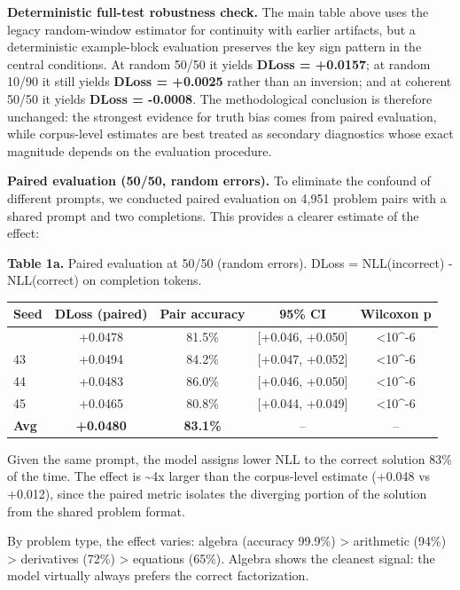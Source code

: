 \documentclass[
  11pt,
]{article}
\newcounter{none} %
\begin{document}
\textbf{Deterministic full-test robustness check.} The main table above
uses the legacy random-window estimator for continuity with earlier
artifacts, but a deterministic example-block evaluation preserves the
key sign pattern in the central conditions. At random 50/50 it yields
\textbf{DLoss = +0.0157}; at random 10/90 it still yields \textbf{DLoss
= +0.0025} rather than an inversion; and at coherent 50/50 it yields
\textbf{DLoss = -0.0008}. The methodological conclusion is therefore
unchanged: the strongest evidence for truth bias comes from paired
evaluation, while corpus-level estimates are best treated as secondary
diagnostics whose exact magnitude depends on the evaluation procedure.

\textbf{Paired evaluation (50/50, random errors).} To eliminate the
confound of different prompts, we conducted paired evaluation on 4,951
problem pairs with a shared prompt and two completions. This provides a
clearer estimate of the effect:

\textbf{Table 1a.} Paired evaluation at 50/50 (random errors). DLoss =
NLL(incorrect) - NLL(correct) on completion tokens.

{\def\LTcaptype{none} %
\begin{longtable}[]{@{}lcccc@{}}
\toprule\noalign{}
Seed & DLoss (paired) & Pair accuracy & 95\% CI & Wilcoxon p \\
\midrule\noalign{}
\endhead
\bottomrule\noalign{}
\endlastfoot
42 & +0.0478 & 81.5\% & {[}+0.046, +0.050{]} & \textless10\^{}-6 \\
43 & +0.0494 & 84.2\% & {[}+0.047, +0.052{]} & \textless10\^{}-6 \\
44 & +0.0483 & 86.0\% & {[}+0.046, +0.050{]} & \textless10\^{}-6 \\
45 & +0.0465 & 80.8\% & {[}+0.044, +0.049{]} & \textless10\^{}-6 \\
\textbf{Avg} & \textbf{+0.0480} & \textbf{83.1\%} & -- & -- \\
\end{longtable}
}

Given the same prompt, the model assigns lower NLL to the correct
solution 83\% of the time. The effect is \textasciitilde4x larger than
the corpus-level estimate (+0.048 vs +0.012), since the paired metric
isolates the diverging portion of the solution from the shared problem
format.

By problem type, the effect varies: algebra (accuracy 99.9\%)
\textgreater{} arithmetic (94\%) \textgreater{} derivatives (72\%)
\textgreater{} equations (65\%). Algebra shows the cleanest signal: the
model virtually always prefers the correct factorization.
\end{document}
